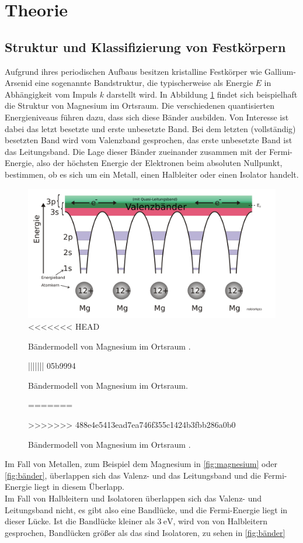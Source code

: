 \section{Theorie}
\label{sec:Theorie}

\subsection{Struktur und Klassifizierung von Festkörpern}
Aufgrund ihres periodischen Aufbaus besitzen kristalline Festkörper wie Gallium-Arsenid eine sogenannte Bandstruktur, die typischerweise als Energie $E$ in Abhängigkeit vom Impuls $k$ darstellt wird.
In Abbildung \ref{fig:magnesium}
findet sich beispielhaft die Struktur von Magnesium im Ortsraum. Die verschiedenen quantisierten Energieniveaus führen dazu, dass sich diese Bänder ausbilden. Von Interesse ist dabei das letzt besetzte und erste unbesetzte Band.
Bei dem letzten (vollständig) besetzten Band wird vom Valenzband gesprochen, das erste unbesetzte Band ist das Leitungsband. Die Lage dieser Bänder zueinander zusammen mit der Fermi-Energie, also der höchsten Energie der Elektronen
beim absoluten Nullpunkt, bestimmen, ob es sich um ein Metall, einen Halbleiter oder einen Isolator handelt.

\begin{figure}[H]
    \centering
    \includegraphics[width=\textwidth]{Bilder/Bändermodell-Potentialtöpfe-Mg.svg.png}
<<<<<<< HEAD
    \caption{Bändermodell von Magnesium im Ortsraum \cite{magnesium}. }
||||||| 05b9994
    \caption{Bändermodell von Magnesium im Ortsraum. \cite{magnesium} }
=======
    \caption{Bändermodell von Magnesium im Ortsraum \cite{magnesium}.}
>>>>>>> 488e4e5413ead7ea746f355c1424b3fbb286a0b0
    \label{fig:magnesium}
\end{figure}
Im Fall von Metallen, zum Beispiel dem Magnesium in \autoref{fig:magnesium} oder \autoref{fig:bänder},
überlappen sich das Valenz- und das Leitungsband und die Fermi-Energie liegt in diesem Überlapp. \\
Im Fall von Halbleitern und Isolatoren überlappen sich das Valenz- und Leitungsband nicht, es gibt also eine Bandlücke, und die Fermi-Energie liegt in dieser Lücke. Ist die Bandlücke kleiner als $\qty{3}{\electronvolt}$, wird von von Halbleitern gesprochen,
Bandlücken größer als das sind Isolatoren, zu sehen in \autoref{fig:bänder}

